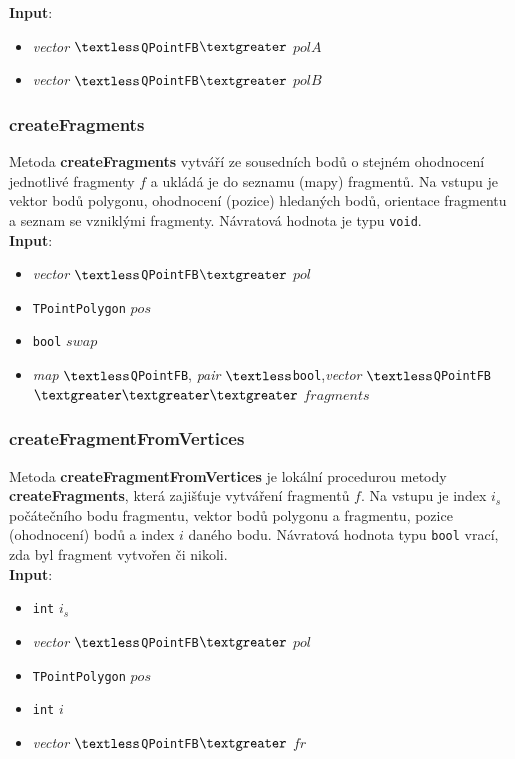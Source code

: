 \documentclass[a4paper, 12pt]{article}
\begin{document}
\textbf{Input}:
\begin{itemize}
\item \textsl{vector} $\textless$\texttt{QPointFB}$\textgreater$ $polA$
\item \textsl{vector} $\textless$\texttt{QPointFB}$\textgreater$ $polB$
\end{itemize}

\subsubsection*{createFragments}
Metoda \textbf{createFragments} vytváří ze sousedních bodů o stejném ohodnocení jednotlivé fragmenty $f$ a ukládá je do seznamu (mapy) fragmentů. Na vstupu je vektor bodů polygonu, ohodnocení (pozice) hledaných bodů, orientace fragmentu a seznam se vzniklými fragmenty. Návratová hodnota je typu \texttt{void}.\\

\textbf{Input}:
\begin{itemize}
\item \textsl{vector} $\textless$\texttt{QPointFB}$\textgreater$ $pol$
\item \texttt{TPointPolygon} $pos$
\item \texttt{bool} $swap$
\item \textsl{map} $\textless$\texttt{QPointFB}, \textsl{pair} $\textless$\texttt{bool},\textsl{vector} $\textless$\texttt{QPointFB}$\textgreater \textgreater \textgreater$ $fragments$
\end{itemize}

\subsubsection*{createFragmentFromVertices}
Metoda \textbf{createFragmentFromVertices} je lokální procedurou metody \textbf{createFragments}, která zajišťuje vytváření fragmentů $f$. Na vstupu je index $i_s$ počátečního bodu fragmentu, vektor bodů polygonu a fragmentu, pozice (ohodnocení) bodů a index $i$ daného bodu. Návratová hodnota typu \texttt{bool} vrací, zda byl fragment vytvořen či nikoli.\\ 

\textbf{Input}:
\begin{itemize}
\item \texttt{int} $i_s$ 
\item \textsl{vector} $\textless$\texttt{QPointFB}$\textgreater$ $pol$
\item \texttt{TPointPolygon} $pos$
\item \texttt{int} $i$ 
\item \textsl{vector} $\textless$\texttt{QPointFB}$\textgreater$ $fr$
\end{itemize}
\end{document}
